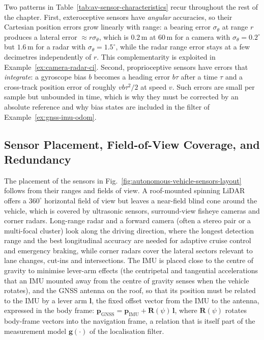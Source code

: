\documentclass[graybox,envcountchap]{style/SNmono}
\begin{document}
Two patterns in Table~\ref{tab:av-sensor-characteristics} recur throughout the rest of the chapter. First, exteroceptive sensors have \emph{angular} accuracies, so their Cartesian position errors grow linearly with range: a bearing error $\sigma_{\theta}$ at range $r$ produces a lateral error $\approx r\sigma_{\theta}$, which is $0.2$\,m at $60$\,m for a camera with $\sigma_{\theta}=0.2^{\circ}$ but $1.6$\,m for a radar with $\sigma_{\theta}=1.5^{\circ}$, while the radar range error stays at a few decimetres independently of $r$. This complementarity is exploited in Example~\ref{ex:camera-radar-ci}. Second, proprioceptive sensors have errors that \emph{integrate}: a gyroscope bias $b$ becomes a heading error $b\tau$ after a time $\tau$ and a cross-track position error of roughly $v b\tau^{2}/2$ at speed $v$. Such errors are small per sample but unbounded in time, which is why they must be corrected by an absolute reference and why bias states are included in the filter of Example~\ref{ex:gnss-imu-odom}.

\subsection{Sensor Placement, Field-of-View Coverage, and Redundancy}
\label{subsec:placement}

The placement of the sensors in Fig.~\ref{fig:autonomous-vehicle-sensors-layout} follows from their ranges and fields of view. A roof-mounted spinning LiDAR offers a $360^{\circ}$ horizontal field of view but leaves a near-field blind cone around the vehicle, which is covered by ultrasonic sensors, surround-view fisheye cameras and corner radars. Long-range radar and a forward camera (often a stereo pair or a multi-focal cluster) look along the driving direction, where the longest detection range and the best longitudinal accuracy are needed for adaptive cruise control and emergency braking, while corner radars cover the lateral sectors relevant to lane changes, cut-ins and intersections. The IMU is placed close to the centre of gravity to minimise lever-arm effects (the centripetal and tangential accelerations that an IMU mounted away from the centre of gravity senses when the vehicle rotates), and the GNSS antenna on the roof, so that its position must be related to the IMU by a lever arm $\mathbf{l}$, the fixed offset vector from the IMU to the antenna, expressed in the body frame: $\mathbf{p}_{\mathrm{GNSS}}=\mathbf{p}_{\mathrm{IMU}}+\mathbf{R}(\psi)\,\mathbf{l}$, where $\mathbf{R}(\psi)$ rotates body-frame vectors into the navigation frame, a relation that is itself part of the measurement model $\mathbf{g}(\cdot)$ of the localisation filter.
\end{document}
